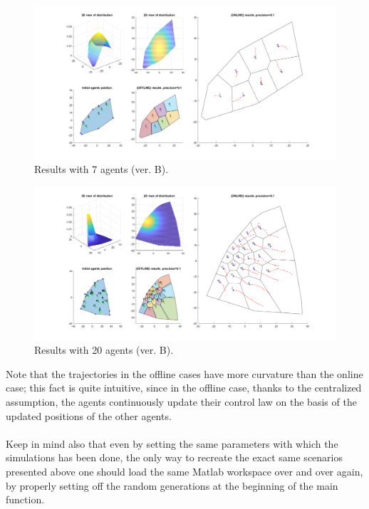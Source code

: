 \documentclass[a4paper,11pt,oneside]{book}
\begin{document}
	
	
	\begin{figure}	[H]
		\centering	
		\includegraphics[scale=0.45,angle=90]{figs/convergenceResultsB.png}
		\caption{Results with 7 agents (ver. B).}\label{fig:convergenceResultsB.png}	
	\end{figure}
	
	\begin{figure}[H]
		\centering	
		\includegraphics[scale=0.45, angle=90]{figs/20convergenceResultsB.png}
		\caption{Results with 20 agents (ver. B).}\label{fig:20convergenceResultsB.png}	
	\end{figure}
	
	Note that the trajectories in the offline cases have more curvature than the online case; this fact is quite intuitive, since in the offline case, thanks to the centralized assumption, the agents continuously update their control law on the basis of the updated positions of the other agents.\\\\
	
	Keep in mind also that even by setting the same parameters with which the simulations has been done, the only way to recreate the exact same scenarios presented above one should load the same Matlab workspace over and over again, by properly setting off the random generations at the beginning of the main function.
	
\end{document}
